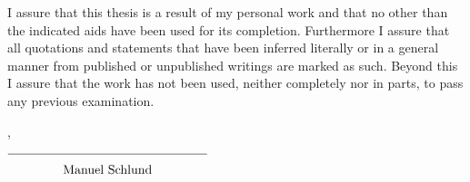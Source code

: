 



I assure that this thesis is a result of my personal work and that no other than the indicated aids have been used for its completion. Furthermore I assure that all quotations and statements that have been inferred literally or in a general manner from published or unpublished writings are marked as such. Beyond this I assure that the work has not been used, neither completely nor in parts, to pass any previous examination.

\vspace{20mm}

\noindent \thePlace{}, \theDate{}

\begin{flushright}
  $\overline{~~~~~~~~~~~~~\raisebox{0mm}[5mm]{\theAuthor{}}~~~~~~~~~~~~~}$
\end{flushright}